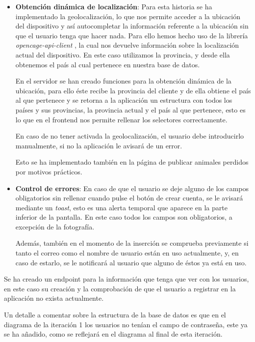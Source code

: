 \begin{itemize}
	\item \textbf{Obtención dinámica de localización}: Para esta historia se ha implementado la geolocalización, lo que nos permite acceder a la ubicación del dispositivo y así autocompletar la información referente a la ubicación sin que el usuario tenga que hacer nada. Para ello hemos hecho uso de la librería \textit{opencage-api-client} \cite{geoapi}, la cual nos devuelve información sobre la localización actual del dispositivo. En este caso utilizamos la provincia, y desde ella obtenemos el país al cual pertenece en nuestra base de datos. 
	
	En el servidor se han creado funciones para la obtención dinámica de la ubicación, para ello éste recibe la provincia del cliente y de ella obtiene el país al que pertenece y se retorna a la aplicación un estructura con todos los países y sus provincias, la provincia actual y el país al que pertenece, esto es lo que en el frontend nos permite rellenar los selectores correctamente.
	
	En caso de no tener activada la geolocalización, el usuario debe introducirlo manualmente, si no la aplicación le avisará de un error.
	
	Esto se ha implementado también en la página de publicar animales perdidos por motivos prácticos.
	
	
	\item \textbf{Control de errores}: En caso de que el usuario se deje alguno de los campos obligatorios sin rellenar cuando pulse el botón de crear cuenta, se le avisará mediante un \textit{toast}, esto es una alerta temporal que aparece en la parte inferior de la pantalla. En este caso todos los campos son obligatorios, a excepción de la fotografía.
	
	Además, también en el momento de la inserción se comprueba previamente si tanto el correo como el nombre de usuario están en uso actualmente, y, en caso de estarlo, se le notificará al usuario que alguno de éstos ya está en uso.
\end{itemize}

Se ha creado un endpoint para la información que tenga que ver con los usuarios, en este caso su creación y la comprobación de que el usuario a registrar en la aplicación no exista actualmente.

Un detalle a comentar sobre la estructura de la base de datos es que en el diagrama de la iteración 1 los usuarios no tenían el campo de contraseña, este ya se ha añadido, como se reflejará en el diagrama al final de esta iteración. \\


